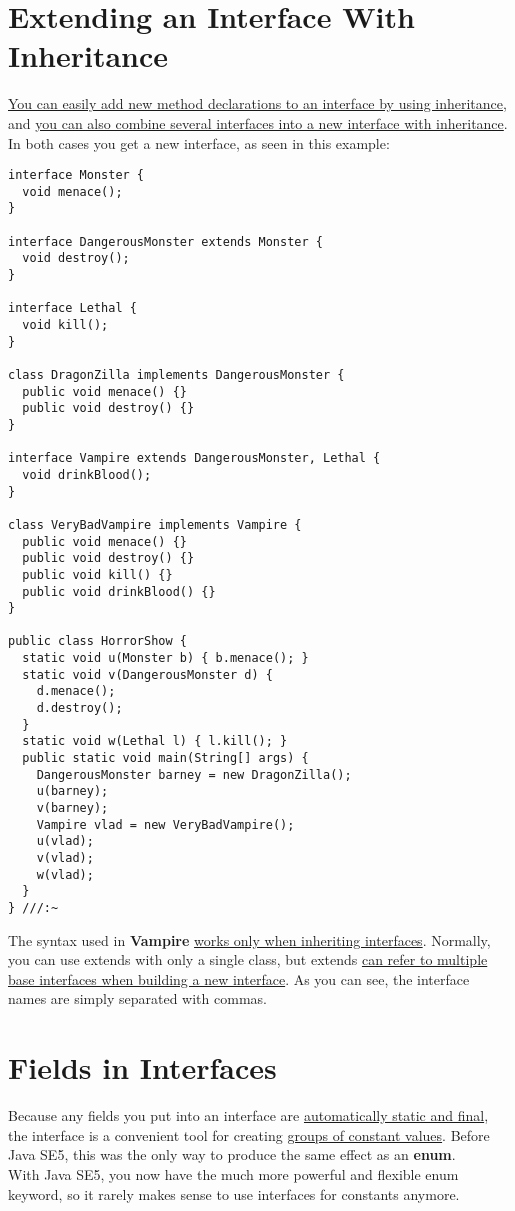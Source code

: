 \documentclass[10pt,letterpaper]{report}
\begin{document}
\section{Extending an Interface With Inheritance}
\underline{You can easily add new method declarations to an interface by using inheritance}, and \underline{you can also combine several interfaces into a new interface with inheritance}. In both cases you get a new interface, as seen in this example:
\begin{lstlisting}
interface Monster {
  void menace();
}

interface DangerousMonster extends Monster {
  void destroy();
}

interface Lethal {
  void kill();
}

class DragonZilla implements DangerousMonster {
  public void menace() {}
  public void destroy() {}
}	

interface Vampire extends DangerousMonster, Lethal {
  void drinkBlood();
}

class VeryBadVampire implements Vampire {
  public void menace() {}
  public void destroy() {}
  public void kill() {}
  public void drinkBlood() {}
}	

public class HorrorShow {
  static void u(Monster b) { b.menace(); }
  static void v(DangerousMonster d) {
    d.menace();
    d.destroy();
  }
  static void w(Lethal l) { l.kill(); }
  public static void main(String[] args) {
    DangerousMonster barney = new DragonZilla();
    u(barney);
    v(barney);
    Vampire vlad = new VeryBadVampire();
    u(vlad);
    v(vlad);
    w(vlad);
  }
} ///:~
\end{lstlisting}
The syntax used in \textbf{Vampire} \underline{works only when inheriting interfaces}. Normally, you can use extends with only a single class, but extends \underline{can refer to multiple} \underline{base interfaces when building a new interface}. As you can see, the interface names are simply separated with commas.
\section{Fields in Interfaces}
Because any fields you put into an interface are \underline{automatically static and final}, the interface is a convenient tool for creating \underline{groups of constant values}. Before Java SE5, this was the only way to produce the same effect as an \textbf{enum}.\\

With Java SE5, you now have the much more powerful and flexible enum keyword, so it rarely makes sense to use interfaces for constants anymore.\\
\end{document}
